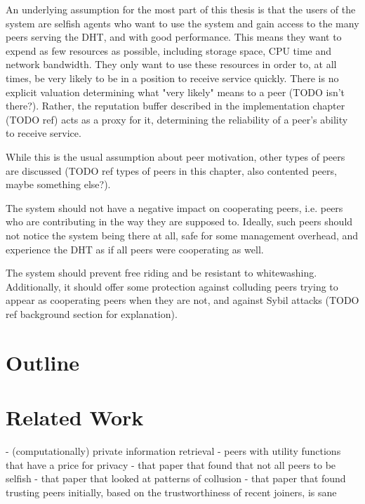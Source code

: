 An underlying assumption for the most part of this thesis is that the users of
the system are selfish agents who want to use the system and gain access to the
many peers serving the \ac{DHT}, and with good performance. This means they want
to expend as few resources as possible, including storage space, CPU time and
network bandwidth. They only want to use these resources in order to, at all
times, be very likely to be in a position to receive service quickly. There is
no explicit valuation determining what "very likely" means to a peer (TODO isn't
there?). Rather, the reputation buffer described in the implementation chapter
(TODO ref) acts as a proxy for it, determining the reliability of a peer's
ability to receive service.

While this is the usual assumption about peer motivation, other types of peers
are discussed (TODO ref types of peers in this chapter, also contented peers,
maybe something else?).

The system should not have a negative impact on cooperating peers, i.e. peers
who are contributing in the way they are supposed to. Ideally, such peers should
not notice the system being there at all, safe for some management overhead, and
experience the \ac{DHT} as if all peers were cooperating as well.

The system should prevent free riding and be resistant to whitewashing.
Additionally, it should offer some protection against colluding peers trying to
appear as cooperating peers when they are not, and against Sybil attacks (TODO
ref background section for explanation).

\section{Outline}

\section{Related Work}
- (computationally) private information retrieval
- peers with utility functions that have a price for privacy
- that paper that found that not all peers to be selfish
- that paper that looked at patterns of collusion
- that paper that found trusting peers initially, based on the trustworthiness
  of recent joiners, is sane
